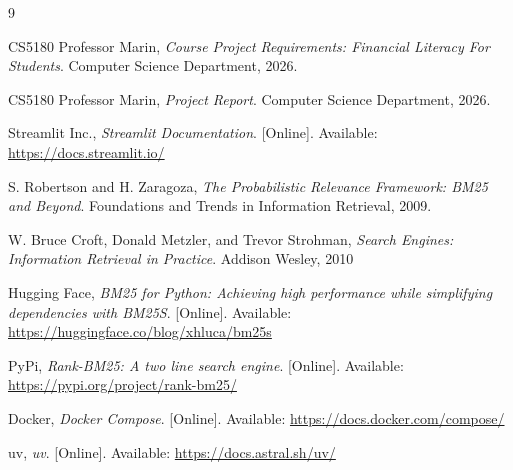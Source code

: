\clearpage
{}
{}

\begin{thebibliography}{9}

CS5180 Professor Marin, \textit{Course Project Requirements: Financial 
Literacy For Students}. Computer Science Department, 2026.

CS5180 Professor Marin, \textit{Project Report}. Computer Science Department, 2026.

Streamlit Inc., \textit{Streamlit Documentation}. [Online]. Available: 
\url{https://docs.streamlit.io/}

S. Robertson and H. Zaragoza, \textit{The Probabilistic Relevance Framework: 
BM25 and Beyond}. Foundations and Trends in Information Retrieval, 2009.

W. Bruce Croft, Donald Metzler, and Trevor Strohman, \textit{Search Engines:  
Information Retrieval in Practice}. Addison Wesley, 2010

Hugging Face, \textit{BM25 for Python: Achieving high performance while 
simplifying dependencies with BM25S}. [Online]. Available: 
\url{https://huggingface.co/blog/xhluca/bm25s}

PyPi, \textit{Rank-BM25: A two line search engine}. [Online].
Available: \url{https://pypi.org/project/rank-bm25/}

Docker, \textit{Docker Compose}. [Online]. Available:
\url{https://docs.docker.com/compose/}

uv, \textit{uv}. [Online]. Available: \url{https://docs.astral.sh/uv/}
\end{thebibliography}